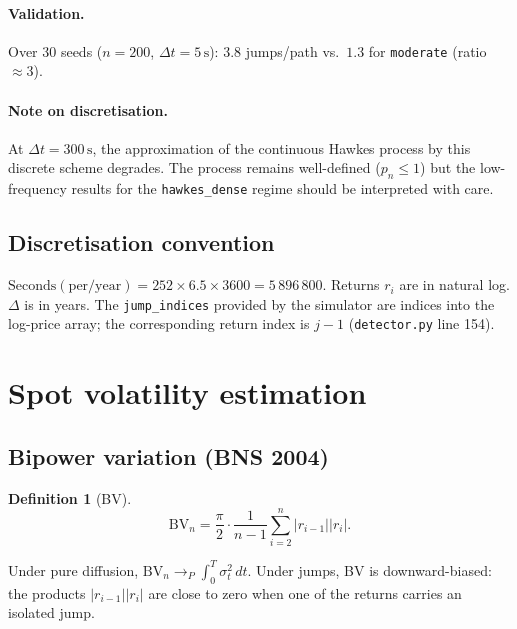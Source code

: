 \documentclass[11pt,a4paper]{article}
\theoremstyle{plain}
\theoremstyle{definition}
\newtheorem{definition}[theorem]{Definition}
\theoremstyle{remark}
\newcommand{\dt}{\Delta}
\begin{document}
\paragraph{Validation.}
Over 30 seeds ($n = 200$, $\dt t = 5\,\mathrm{s}$): $3.8$ jumps/path vs.\
$1.3$ for \texttt{moderate} (ratio $\approx 3$).

\paragraph{Note on discretisation.}
At $\dt t = 300\,\mathrm{s}$, the approximation of the continuous Hawkes
process by this discrete scheme degrades. The process remains well-defined
($p_n \le 1$) but the low-frequency results for the \texttt{hawkes\_dense}
regime should be interpreted with care.

\subsection{Discretisation convention}

$\mathrm{Seconds(per/year)} = 252 \times 6.5 \times 3600 = 5\,896\,800$.
Returns $r_i$ are in natural log. $\dt$ is in years. The
\texttt{jump\_indices} provided by the simulator are indices into the
log-price array; the corresponding return index is $j - 1$
(\texttt{detector.py} line 154).

\section{Spot volatility estimation}
\label{sec:estimators}

\subsection{Bipower variation (BNS 2004)}

\begin{definition}[BV]
\begin{equation}\label{eq:bv}
  \mathrm{BV}_n = \frac{\pi}{2} \cdot \frac{1}{n-1}
    \sum_{i=2}^{n} |r_{i-1}||r_i|.
\end{equation}
\end{definition}
Under pure diffusion, $\mathrm{BV}_n \to_P \int_0^T \sigma_t^2\,dt$.
Under jumps, BV is downward-biased: the products $|r_{i-1}||r_i|$ are close
to zero when one of the returns carries an isolated jump.
\end{document}
